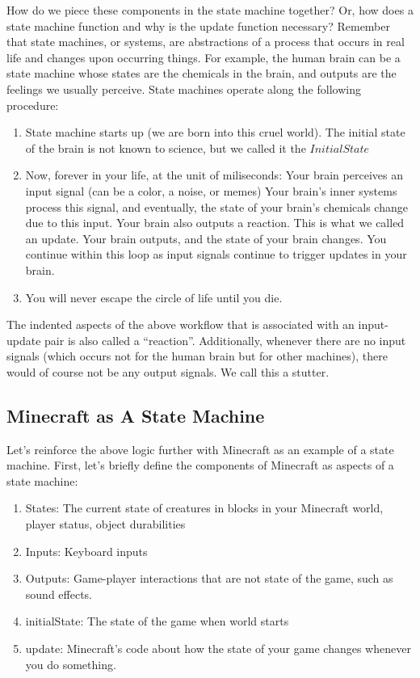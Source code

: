 How do we piece these components in the state machine together?
Or, how does a state machine function and why is the update function necessary?
Remember that state machines, or systems, are abstractions of a process that occurs in real life and changes upon occurring things.
For example, the human brain can be a state machine whose states are the chemicals in the brain, and outputs are the feelings we usually perceive.
State machines operate along the following procedure:
\begin{enumerate}
    \item State machine starts up (we are born into this cruel world). The initial state of the brain is not known to science, but we called it the $InitialState$
    \item Now, forever in your life, at the unit of miliseconds:
    \subitem Your brain perceives an input signal (can be a color, a noise, or memes)
    \subitem Your brain's inner systems process this signal, and eventually, the state of your brain's chemicals change due to this input. Your brain also outputs a reaction. This is what we called an update.
    \subitem Your brain outputs, and the state of your brain changes. You continue within this loop as input signals continue to trigger updates in your brain.
    \item You will never escape the circle of life until you die.
\end{enumerate}

The indented aspects of the above workflow that is associated with an input-update pair is also called a ``reaction''.
Additionally, whenever there are no input signals (which occurs not for the human brain but for other machines), there would of course not be any output signals. We call this a stutter.

\subsection{Minecraft as A State Machine}
Let's reinforce the above logic further with Minecraft as an example of a state machine.
First, let's briefly define the components of Minecraft as aspects of a state machine:
\begin{enumerate}
    \item[] States: The current state of creatures in blocks in your Minecraft world, player status, object durabilities
    \item[] Inputs: Keyboard inputs
    \item[] Outputs: Game-player interactions that are not state of the game, such as sound effects.
    \item[] initialState: The state of the game when world starts
    \item[] update: Minecraft's code about how the state of your game changes whenever you do something.
\end{enumerate}

